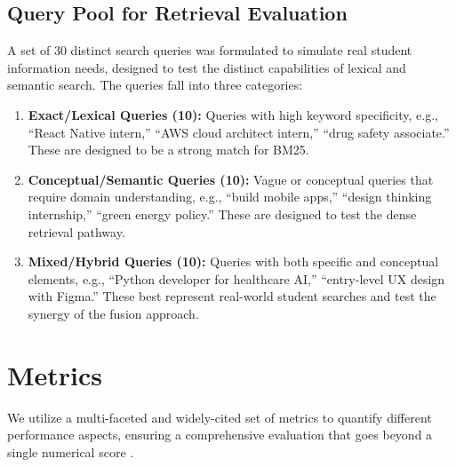 \subsection{Query Pool for Retrieval Evaluation}
A set of 30 distinct search queries was formulated to simulate real student information needs, designed to test the distinct capabilities of lexical and semantic search. The queries fall into three categories:
\begin{enumerate}
    \item \textbf{Exact/Lexical Queries (10):} Queries with high keyword specificity, e.g., ``React Native intern,'' ``AWS cloud architect intern,'' ``drug safety associate.'' These are designed to be a strong match for BM25.
    \item \textbf{Conceptual/Semantic Queries (10):} Vague or conceptual queries that require domain understanding, e.g., ``build mobile apps,'' ``design thinking internship,'' ``green energy policy.'' These are designed to test the dense retrieval pathway.
    \item \textbf{Mixed/Hybrid Queries (10):} Queries with both specific and conceptual elements, e.g., ``Python developer for healthcare AI,'' ``entry-level UX design with Figma.'' These best represent real-world student searches and test the synergy of the fusion approach.
\end{enumerate}

\section{Metrics}
We utilize a multi-faceted and widely-cited set of metrics to quantify different performance aspects, ensuring a comprehensive evaluation that goes beyond a single numerical score \cite{manning2008introduction, jurafsky2023speech, li2020survey}.

